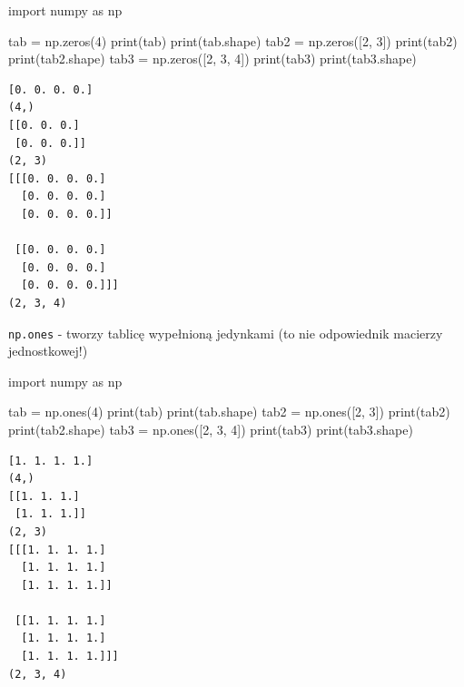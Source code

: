\documentclass[
  letterpaper,
  DIV=11,
  numbers=noendperiod]{scrreprt}
\newenvironment{Shaded}{\begin{snugshade}}{\end{snugshade}}
\newcommand{\BuiltInTok}[1]{\textcolor[rgb]{0.00,0.23,0.31}{#1}}
\newcommand{\DecValTok}[1]{\textcolor[rgb]{0.68,0.00,0.00}{#1}}
\newcommand{\ImportTok}[1]{\textcolor[rgb]{0.00,0.46,0.62}{#1}}
\newcommand{\NormalTok}[1]{\textcolor[rgb]{0.00,0.23,0.31}{#1}}
\newcommand{\OperatorTok}[1]{\textcolor[rgb]{0.37,0.37,0.37}{#1}}
\begin{document}
\begin{Shaded}
\begin{Highlighting}[]
\ImportTok{import}\NormalTok{ numpy }\ImportTok{as}\NormalTok{ np}

\NormalTok{tab }\OperatorTok{=}\NormalTok{ np.zeros(}\DecValTok{4}\NormalTok{)}
\BuiltInTok{print}\NormalTok{(tab)}
\BuiltInTok{print}\NormalTok{(tab.shape)}
\NormalTok{tab2 }\OperatorTok{=}\NormalTok{ np.zeros([}\DecValTok{2}\NormalTok{, }\DecValTok{3}\NormalTok{])}
\BuiltInTok{print}\NormalTok{(tab2)}
\BuiltInTok{print}\NormalTok{(tab2.shape)}
\NormalTok{tab3 }\OperatorTok{=}\NormalTok{ np.zeros([}\DecValTok{2}\NormalTok{, }\DecValTok{3}\NormalTok{, }\DecValTok{4}\NormalTok{])}
\BuiltInTok{print}\NormalTok{(tab3)}
\BuiltInTok{print}\NormalTok{(tab3.shape)}
\end{Highlighting}
\end{Shaded}

\begin{verbatim}
[0. 0. 0. 0.]
(4,)
[[0. 0. 0.]
 [0. 0. 0.]]
(2, 3)
[[[0. 0. 0. 0.]
  [0. 0. 0. 0.]
  [0. 0. 0. 0.]]

 [[0. 0. 0. 0.]
  [0. 0. 0. 0.]
  [0. 0. 0. 0.]]]
(2, 3, 4)
\end{verbatim}

\texttt{np.ones} - tworzy tablicę wypełnioną jedynkami (to nie
odpowiednik macierzy jednostkowej!)

\begin{Shaded}
\begin{Highlighting}[]
\ImportTok{import}\NormalTok{ numpy }\ImportTok{as}\NormalTok{ np}

\NormalTok{tab }\OperatorTok{=}\NormalTok{ np.ones(}\DecValTok{4}\NormalTok{)}
\BuiltInTok{print}\NormalTok{(tab)}
\BuiltInTok{print}\NormalTok{(tab.shape)}
\NormalTok{tab2 }\OperatorTok{=}\NormalTok{ np.ones([}\DecValTok{2}\NormalTok{, }\DecValTok{3}\NormalTok{])}
\BuiltInTok{print}\NormalTok{(tab2)}
\BuiltInTok{print}\NormalTok{(tab2.shape)}
\NormalTok{tab3 }\OperatorTok{=}\NormalTok{ np.ones([}\DecValTok{2}\NormalTok{, }\DecValTok{3}\NormalTok{, }\DecValTok{4}\NormalTok{])}
\BuiltInTok{print}\NormalTok{(tab3)}
\BuiltInTok{print}\NormalTok{(tab3.shape)}
\end{Highlighting}
\end{Shaded}

\begin{verbatim}
[1. 1. 1. 1.]
(4,)
[[1. 1. 1.]
 [1. 1. 1.]]
(2, 3)
[[[1. 1. 1. 1.]
  [1. 1. 1. 1.]
  [1. 1. 1. 1.]]

 [[1. 1. 1. 1.]
  [1. 1. 1. 1.]
  [1. 1. 1. 1.]]]
(2, 3, 4)
\end{verbatim}
\end{document}
